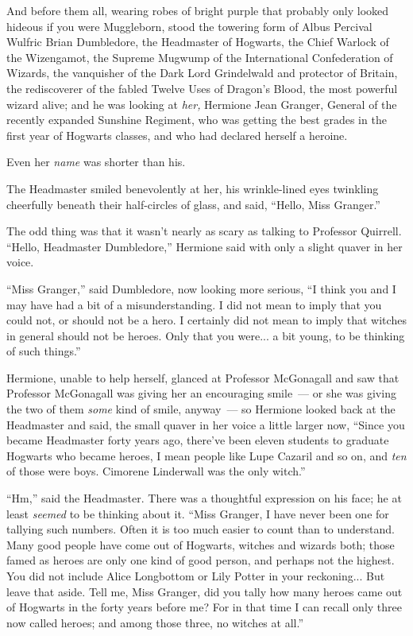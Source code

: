 And before them all, wearing robes of bright purple that probably only looked hideous if you were Muggleborn, stood the towering form of Albus Percival Wulfric Brian Dumbledore, the Headmaster of Hogwarts, the Chief Warlock of the Wizengamot, the Supreme Mugwump of the International Confederation of Wizards, the vanquisher of the Dark Lord Grindelwald and protector of Britain, the rediscoverer of the fabled Twelve Uses of Dragon's Blood, the most powerful wizard alive; and he was looking at \emph{her,} Hermione Jean Granger, General of the recently expanded Sunshine Regiment, who was getting the best grades in the first year of Hogwarts classes, and who had declared herself a heroine.

Even her \emph{name} was shorter than his.

The Headmaster smiled benevolently at her, his wrinkle-lined eyes twinkling cheerfully beneath their half-circles of glass, and said, ``Hello, Miss Granger.''

The odd thing was that it wasn't nearly as scary as talking to Professor Quirrell. ``Hello, Headmaster Dumbledore,'' Hermione said with only a slight quaver in her voice.

``Miss Granger,'' said Dumbledore, now looking more serious, ``I think you and I may have had a bit of a misunderstanding. I did not mean to imply that you could not, or should not be a hero. I certainly did not mean to imply that witches in general should not be heroes. Only that you were... a bit young, to be thinking of such things.''

Hermione, unable to help herself, glanced at Professor McGonagall and saw that Professor McGonagall was giving her an encouraging smile~--- or she was giving the two of them \emph{some} kind of smile, anyway~--- so Hermione looked back at the Headmaster and said, the small quaver in her voice a little larger now, ``Since you became Headmaster forty years ago, there've been eleven students to graduate Hogwarts who became heroes, I mean people like Lupe Cazaril and so on, and \emph{ten} of those were boys. Cimorene Linderwall was the only witch.''

``Hm,'' said the Headmaster. There was a thoughtful expression on his face; he at least \emph{seemed} to be thinking about it. ``Miss Granger, I have never been one for tallying such numbers. Often it is too much easier to count than to understand. Many good people have come out of Hogwarts, witches and wizards both; those famed as heroes are only one kind of good person, and perhaps not the highest. You did not include Alice Longbottom or Lily Potter in your reckoning... But leave that aside. Tell me, Miss Granger, did you tally how many heroes came out of Hogwarts in the forty years before me? For in that time I can recall only three now called heroes; and among those three, no witches at all.''

